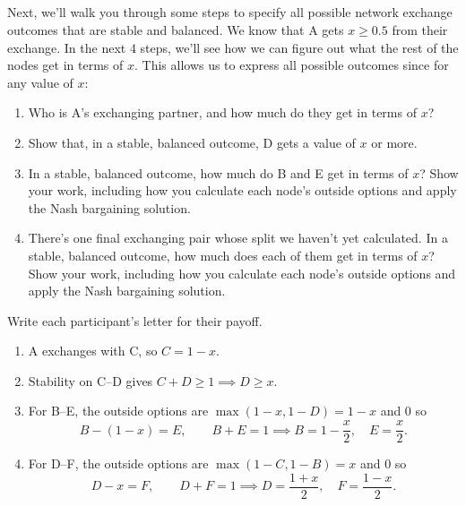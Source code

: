 \documentclass[newpages]{assignment}
\begin{document}
\subsection{}
\begin{problem}
    Next, we'll walk you through some steps to specify all possible network exchange outcomes that are stable and balanced. We know that A gets \(x\geq 0.5\) from their exchange. In the next 4 steps, we'll see how we can figure out what the rest of the nodes get in terms of \(x\). This allows us to express all possible outcomes since for any value of \(x\):
    \begin{enumerate}[label=\roman*.]
        \item Who is A's exchanging partner, and how much do they get in terms of \(x\)?
        \item Show that, in a stable, balanced outcome, D gets a value of \(x\) or more.
        \item In a stable, balanced outcome, how much do B and E get in terms of \(x\)? Show your work, including how you calculate each node's outside options and apply the Nash bargaining solution.
        \item There's one final exchanging pair whose split we haven't yet calculated. In a stable, balanced outcome, how much does each of them get in terms of \(x\)? Show your work, including how you calculate each node's outside options and apply the Nash bargaining solution.
    \end{enumerate}
\end{problem}

\begin{solution}
    Write each participant's letter for their payoff.
    \begin{enumerate}[label=\roman*.]
        \item A exchanges with C, so \(C=1-x\).
        \item Stability on C--D gives \(C+D\geq 1\implies D\geq x\).
        \item For B--E, the outside options are \(\max(1-x,1-D)=1-x\) and 0 so
              \[
                  B-(1-x)=E,\qquad B+E=1
                  \implies B=1-\frac{x}{2},\quad E=\frac{x}{2}.
              \]
        \item For D--F, the outside options are \(\max(1-C,1-B)=x\) and 0 so
              \[
                  D-x=F,\qquad D+F=1
                  \implies D=\frac{1+x}{2},\quad F=\frac{1-x}{2}.
              \]
    \end{enumerate}
\end{solution}
\end{document}

